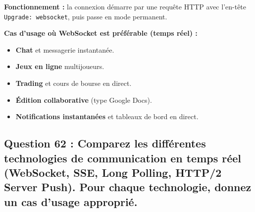 \documentclass[12pt,a4paper]{article}
\begin{document}
\textbf{Fonctionnement :} la connexion d\'emarre par une requ\^ete HTTP avec l'en-t\^ete \texttt{Upgrade: websocket}, puis passe en mode permanent.

\textbf{Cas d'usage o\`u WebSocket est pr\'ef\'erable (temps r\'eel) :}
\begin{itemize}
  \item \textbf{Chat} et messagerie instantan\'ee.
  \item \textbf{Jeux en ligne} multijoueurs.
  \item \textbf{Trading} et cours de bourse en direct.
  \item \textbf{\'Edition collaborative} (type Google Docs).
  \item \textbf{Notifications instantan\'ees} et tableaux de bord en direct.
\end{itemize}

\subsection*{Question 62 : Comparez les diff\'erentes technologies de communication en temps r\'eel (WebSocket, SSE, Long Polling, HTTP/2 Server Push). Pour chaque technologie, donnez un cas d'usage appropri\'e.}
\end{document}
